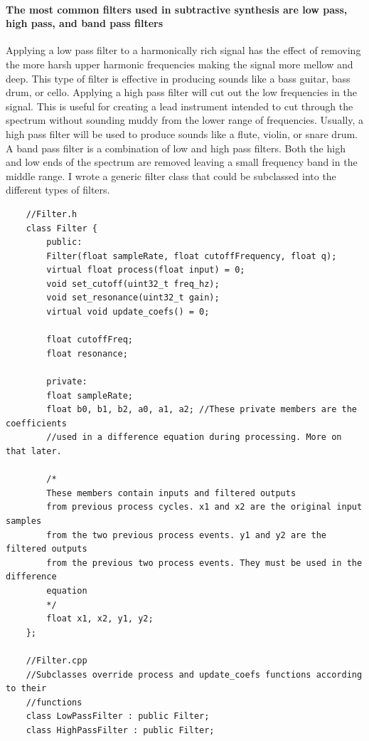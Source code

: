 \documentclass[acmlarge,screen]{acmart}
\begin{document}
	\paragraph{The most common filters used in subtractive synthesis are low pass, high pass, and band pass filters} Applying a low pass filter to a harmonically rich signal has the effect of removing the more harsh upper harmonic frequencies making the signal more mellow and deep. This type of filter is effective in producing sounds like a bass guitar, bass drum, or cello. Applying a high pass filter will cut out the low frequencies in the signal. This is useful for creating a lead instrument intended to cut through the spectrum without sounding muddy from the lower range of frequencies. Usually, a high pass filter will be used to produce sounds like a flute, violin, or snare drum. A band pass filter is a combination of low and high pass filters. Both the high and low ends of the spectrum are removed leaving a small frequency band in the middle range. I wrote a generic filter class that could be subclassed into the different types of filters. \cite{hass_2021} \cite{lacamera_2020}
	
	\begin{verbatim}
	//Filter.h
	class Filter {
		public:
		Filter(float sampleRate, float cutoffFrequency, float q);
		virtual float process(float input) = 0;
		void set_cutoff(uint32_t freq_hz);
		void set_resonance(uint32_t gain);
		virtual void update_coefs() = 0;
		
		float cutoffFreq;
		float resonance;
		
		private:
		float sampleRate;
		float b0, b1, b2, a0, a1, a2; //These private members are the coefficients
		//used in a difference equation during processing. More on that later.
		
		/*
		These members contain inputs and filtered outputs
		from previous process cycles. x1 and x2 are the original input samples
		from the two previous process events. y1 and y2 are the filtered outputs
		from the previous two process events. They must be used in the difference
		equation
		*/
		float x1, x2, y1, y2;
	};
	
	//Filter.cpp
	//Subclasses override process and update_coefs functions according to their
	//functions
	class LowPassFilter : public Filter;
	class HighPassFilter : public Filter;
	\end{verbatim}
	
	\clearpage
\end{document}
